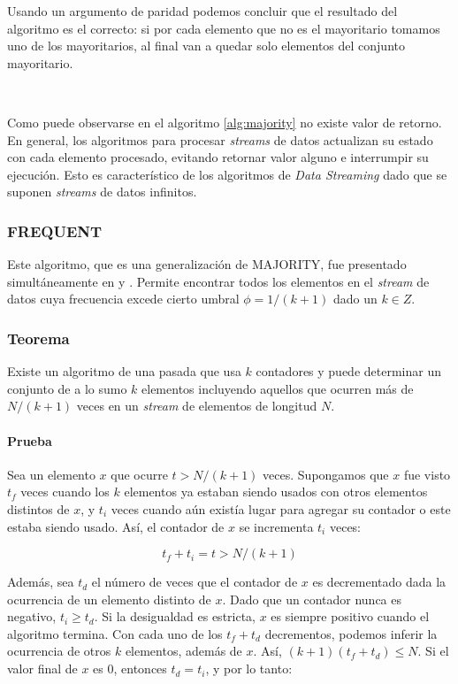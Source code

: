 \documentclass[a4paper,12pt, oneside]{article}
\begin{document}
Usando un argumento de paridad podemos concluir que el resultado del algoritmo es el correcto: si por cada elemento que no es el mayoritario tomamos uno de los mayoritarios, al final van a quedar solo elementos del conjunto mayoritario.

\

Como puede observarse en el algoritmo \ref{alg:majority} no existe valor de retorno. En general, los algoritmos para procesar \textit{streams} de datos actualizan su estado con cada elemento procesado, evitando retornar valor alguno e interrumpir su ejecución. Esto es característico de los algoritmos de \textit{Data Streaming} dado que se suponen \textit{streams} de datos infinitos.

\subsubsection{FREQUENT}\label{FREQUENT}

Este algoritmo, que es una generalización de MAJORITY, fue presentado simultáneamente en \cite{Karp:2003:SAF:762471.762473} y \cite{Demaine:2002:FEI:647912.740658}. Permite encontrar todos los elementos en el \textit{stream} de datos cuya frecuencia excede cierto umbral $\phi = 1/(k+1)$ dado un $k \in Z$. 

\subsubsection*{Teorema} Existe un algoritmo de una pasada que usa $k$ contadores y puede determinar un conjunto de a lo sumo $k$ elementos incluyendo aquellos que ocurren más de $N/(k+1)$ veces en un \textit{stream} de elementos de longitud $N$.


\paragraph{Prueba} Sea un elemento $x$ que ocurre $t > N/(k+1)$ veces. Supongamos que $x$ fue visto $t_f$ veces cuando los $k$ elementos ya estaban siendo usados con otros elementos distintos de $x$, y $t_i$ veces cuando aún existía lugar para agregar su contador o este estaba siendo usado. Así, el contador de $x$ se incrementa $t_i$ veces:

\begin{equation*}
	t_f + t_i = t > N/(k+1)
\end{equation*}

Además, sea $t_d$ el número de veces que el contador de $x$ es decrementado dada la ocurrencia de un elemento distinto de $x$. Dado que un contador nunca es negativo, $t_i \geq t_d$. Si la desigualdad es estricta, $x$ es siempre positivo cuando el algoritmo termina. Con cada uno de los $t_f + t_d$ decrementos, podemos inferir la ocurrencia de otros $k$ elementos, además de $x$. Así, $(k+1)(t_f + t_d) \leq N$. Si el valor final de $x$ es $0$, entonces $t_d = t_i$, y por lo tanto:
\end{document}
